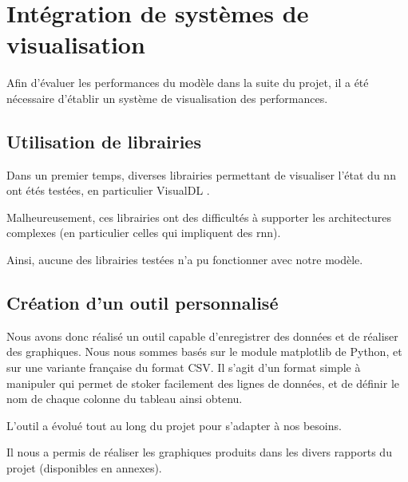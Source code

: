 \section{Intégration de systèmes de visualisation}\label{sec:gmsnn_track}
Afin d'évaluer les performances du modèle dans la suite du projet, il a été nécessaire d'établir un système de visualisation des performances.

\subsection{Utilisation de librairies}
Dans un premier temps, diverses librairies permettant de visualiser l'état du \gls{nn} ont étés testées, en particulier VisualDL \autocite{VisualDLGit,VisualDLSite}.

Malheureusement, ces librairies ont des difficultés à supporter les architectures complexes (en particulier celles qui impliquent des \gls{rnn}).

Ainsi, aucune des librairies testées n'a pu fonctionner avec notre modèle.

\subsection{Création d'un outil personnalisé}
Nous avons donc réalisé un outil capable d'enregistrer des données et de réaliser des graphiques. Nous nous sommes basés sur le module \og matplotlib\fg{} de Python, et sur une variante française du format CSV. Il s'agit d'un format simple à manipuler qui permet de stoker facilement des lignes de données, et de définir le nom de chaque colonne du tableau ainsi obtenu.

L'outil a évolué tout au long du projet pour s'adapter à nos besoins.

Il nous a permis de réaliser les graphiques produits dans les divers rapports du projet (disponibles en annexes).

